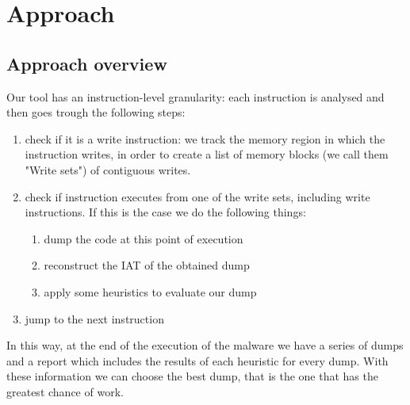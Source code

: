 \chapter{Approach}
\label{chapter3}
\thispagestyle{empty}

\section{Approach overview}
Our tool has an instruction-level granularity: each instruction is analysed and then goes trough the following steps:
\begin{enumerate}
\item check if it is a write instruction: we track the memory region in which the instruction writes, in order to create a list of memory blocks (we call them "Write sets") of contiguous writes.
\item check if instruction executes from one of the write sets, including write instructions. If this is the case we do the following things:
	\begin{enumerate}
	\item dump the code at this point of execution
	\item reconstruct the IAT of the obtained dump
	\item apply some heuristics to evaluate our dump 
	\end{enumerate}
\item jump to the next instruction
\end{enumerate}
In this way, at the end of the execution of the malware we have a series of dumps and a report which includes the results of each heuristic for every dump. With these information we can choose the best dump, that is the one that has the greatest chance of work.\\


